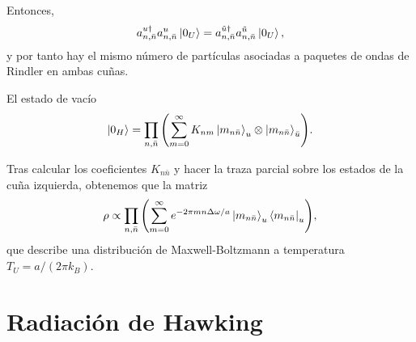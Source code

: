 Entonces, 
\begin{equation}
  a_{n,\bar n}^{u\dagger} a_{n,\bar n}^u \ket{0_U} = a_{n,\bar n}^{\tilde u\dagger}a_{n,\bar n}^{\tilde u} \ket{0_U},
\end{equation}
y por tanto hay el mismo número de partículas asociadas a paquetes de ondas de Rindler en ambas
cuñas.

El estado de vacío 
\begin{equation}
  \ket{0_H} = \prod_{n,\bar n} \qty(\sum_{m=0}^\infty K_{nm} \ket{m_{n\bar n}}_u\otimes \ket{m_{n\bar n}}_{\bar u}).
\end{equation}



Tras calcular los coeficientes $K_{n \bar n}$ y hacer la traza parcial sobre los estados de
la cuña izquierda, obtenemos que la matriz 
\begin{equation}
  \rho  \propto \prod_{n,\bar n} \qty(\sum_{m=0}^\infty e^{-2\pi m n\Delta  \omega/a}\ket{m_{n\bar n}}_u \bra{m_{n\bar n}}_u),
\end{equation}
que describe una distribución de Maxwell-Boltzmann a temperatura $T_U=a/(2\pi k_B)$.




\section{Radiación de Hawking}





